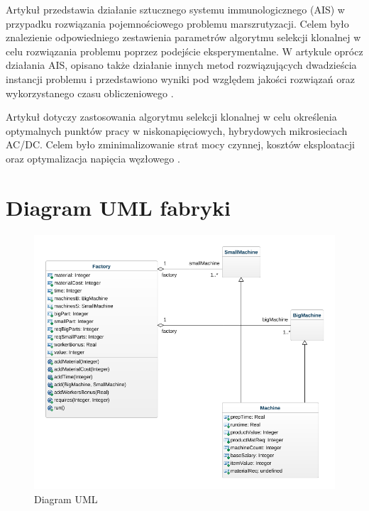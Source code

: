 \documentclass[a4paper]{article}
\begin{document}
Artykuł przedstawia działanie sztucznego systemu immunologicznego (AIS) w przypadku rozwiązania pojemnościowego problemu marszrutyzacji. Celem było znalezienie odpowiedniego zestawienia parametrów algorytmu selekcji klonalnej w celu rozwiązania problemu poprzez podejście eksperymentalne. W artykule oprócz działania AIS, opisano także działanie innych metod rozwiązujących dwadzieścia instancji problemu i przedstawiono wyniki pod względem jakości rozwiązań oraz wykorzystanego czasu obliczeniowego \cite{thapatsuwan}.


Artykuł dotyczy zastosowania algorytmu selekcji klonalnej w celu określenia optymalnych punktów pracy w niskonapięciowych, hybrydowych mikrosieciach AC/DC. Celem było zminimalizowanie strat mocy czynnej, kosztów eksploatacji oraz optymalizacja napięcia węzłowego \cite{rokicki}.


\section{Diagram UML fabryki}
\begin{figure}[ht]
\centering
\includegraphics[width=.7\textwidth]{UML_Model.png}
\caption{Diagram UML}
\end{figure}


\newpage
\printbibliography
\end{document}
